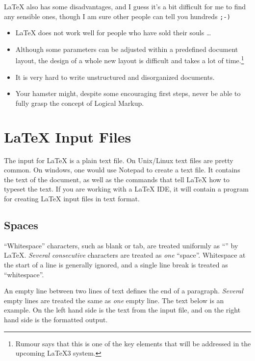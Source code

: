 \medskip

\noindent\LaTeX{} also has some disadvantages, and I guess it's a bit
difficult for me to find any sensible ones, though I am sure other people
can tell you hundreds \texttt{;-)}

\begin{itemize}
\item \LaTeX{} does not work well for people who have sold their
  souls \ldots
\item Although some parameters can be adjusted within a predefined
  document layout, the design of a whole new layout is difficult and
  takes a lot of time.\footnote{Rumour says that this is one of the
    key elements that will be addressed in the upcoming \LaTeX 3
    system.}
\item It is very hard to write unstructured and disorganized documents.
\item Your hamster might, despite some encouraging first steps, never be
able to fully grasp the concept of Logical Markup.
\end{itemize}

\section{\LaTeX{} Input Files}

The input for \LaTeX{} is a plain text file. On Unix/Linux text files are
pretty common. On windows, one would use Notepad to create a text file. It
contains the text of the document, as well as the commands that tell
\LaTeX{} how to typeset the text. If you are working with a \LaTeX{} IDE, it will contain a program for creating
\LaTeX{} input files in text format.

\subsection{Spaces}

``Whitespace'' characters, such as blank or tab, are
treated uniformly as ``'' by \LaTeX{}. \emph{Several
  consecutive}  characters are treated as \emph{one}
``space''.  Whitespace at the start of a line is generally ignored, and
a single line break is treated as ``whitespace''.

An empty line between two lines of text defines the end of a
paragraph. \emph{Several} empty lines are treated the same as
\emph{one} empty line. The text below is an example. On the left hand
side is the text from the input file, and on the right hand side is the
formatted output.

